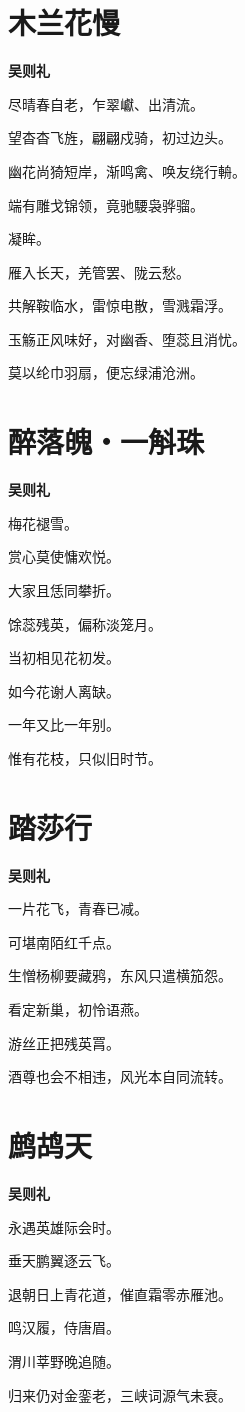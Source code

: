 \documentclass[12pt,a4paper]{ctexbook}
\begin{document}
\section{木兰花慢}
\textbf{吴则礼}\par\vspace{0.5em}
尽晴春自老，乍翠巘、出清流。\par
望杳杳飞旌，翩翩戍骑，初过边头。\par
幽花尚猗短岸，渐鸣禽、唤友绕行輈。\par
端有雕戈锦领，竟驰騕袅骅骝。\par
凝眸。\par
雁入长天，羌管罢、陇云愁。\par
共解鞍临水，雷惊电散，雪溅霜浮。\par
玉觞正风味好，对幽香、堕蕊且消忧。\par
莫以纶巾羽扇，便忘绿浦沧洲。\par

\section{醉落魄・一斛珠}
\textbf{吴则礼}\par\vspace{0.5em}
梅花褪雪。\par
赏心莫使慵欢悦。\par
大家且恁同攀折。\par
馀蕊残英，偏称淡笼月。\par
当初相见花初发。\par
如今花谢人离缺。\par
一年又比一年别。\par
惟有花枝，只似旧时节。\par

\section{踏莎行}
\textbf{吴则礼}\par\vspace{0.5em}
一片花飞，青春已减。\par
可堪南陌红千点。\par
生憎杨柳要藏鸦，东风只遣横笳怨。\par
看定新巢，初怜语燕。\par
游丝正把残英罥。\par
酒尊也会不相违，风光本自同流转。\par

\section{鹧鸪天}
\textbf{吴则礼}\par\vspace{0.5em}
永遇英雄际会时。\par
垂天鹏翼逐云飞。\par
退朝日上青花道，催直霜零赤雁池。\par
鸣汉履，侍唐眉。\par
渭川莘野晚追随。\par
归来仍对金銮老，三峡词源气未衰。\par
\end{document}
